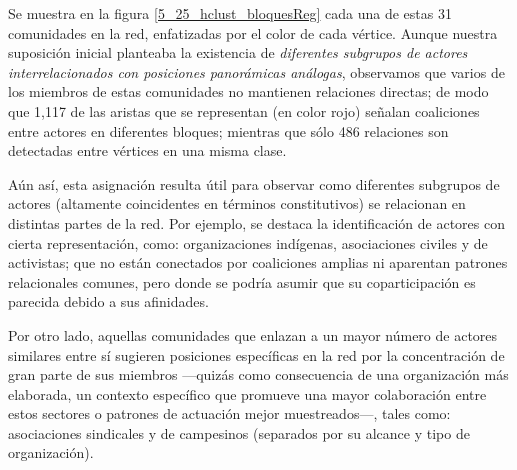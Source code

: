 \documentclass[letterpaper, 11pt]{book}
\theoremstyle{definition}
\theoremstyle{remark}
\begin{document}
Se muestra en la figura \ref{5_25_hclust_bloquesReg} cada una de estas 31 comunidades en la red, enfatizadas por el color de cada vértice. 
Aunque nuestra suposición inicial planteaba la existencia de \emph{diferentes subgrupos de actores interrelacionados con posiciones panorámicas análogas}, 
observamos que varios de los miembros de estas comunidades no mantienen relaciones directas; de modo que 1,117 de las aristas que se representan (en color rojo) señalan coaliciones entre actores en diferentes bloques; mientras que sólo 486 relaciones son detectadas entre vértices en una misma clase. 


Aún así, esta asignación resulta útil para observar como diferentes subgrupos de actores (altamente coincidentes en términos constitutivos) se relacionan en distintas partes de la red. 
Por ejemplo, se destaca la identificación de actores con cierta representación, como: organizaciones indígenas, asociaciones civiles y de activistas; que no están conectados por coaliciones amplias ni aparentan patrones relacionales comunes, pero donde se podría asumir que su coparticipación es parecida debido a sus afinidades. 


Por otro lado, aquellas comunidades que enlazan a un mayor número de actores similares entre sí sugieren posiciones específicas en la red por la concentración de gran parte de sus miembros ---quizás como consecuencia de una organización más elaborada, un contexto específico que promueve una mayor colaboración entre estos sectores o patrones de actuación mejor muestreados---, tales como: asociaciones sindicales y de campesinos (separados por su alcance y tipo de organización).
\end{document}
